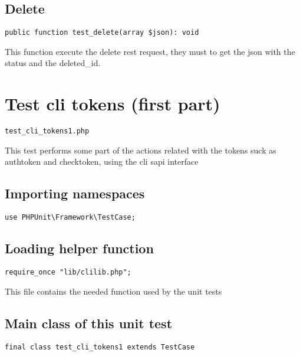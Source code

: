 \documentclass[a4paper]{book}
\begin{document}
\hypertarget{toc30}{}
\subsection{Delete}

\begin{lstlisting}
public function test_delete(array $json): void
\end{lstlisting}

This function execute the delete rest request, they must to get the json
with the status and the deleted\_id.

\hypertarget{toc31}{}
\section{Test cli tokens (first part)}

\begin{lstlisting}
test_cli_tokens1.php
\end{lstlisting}

This test performs some part of the actions related with the tokens suck
as authtoken and checktoken, using the cli sapi interface

\hypertarget{toc32}{}
\subsection{Importing namespaces}

\begin{lstlisting}
use PHPUnit\Framework\TestCase;
\end{lstlisting}

\hypertarget{toc33}{}
\subsection{Loading helper function}

\begin{lstlisting}
require_once "lib/clilib.php";
\end{lstlisting}

This file contains the needed function used by the unit tests

\hypertarget{toc34}{}
\subsection{Main class of this unit test}

\begin{lstlisting}
final class test_cli_tokens1 extends TestCase
\end{lstlisting}
\end{document}
